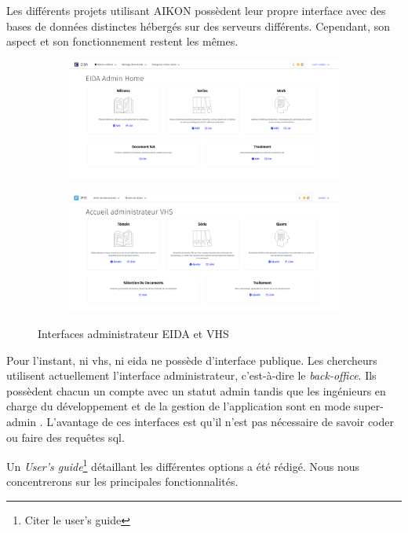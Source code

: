 Les différents projets utilisant AIKON possèdent leur propre interface avec des bases de données distinctes hébergés sur des serveurs différents. Cependant, son aspect et son fonctionnement restent les mêmes.

\begin{figure}[h]
	\centering
	\begin{subfigure}{0.48\linewidth}
		\centering
		\includegraphics[width=\linewidth]{images/accueil_eida.png}
	\end{subfigure}
	\hfill
	\begin{subfigure}{0.48\linewidth}
		\centering
		\includegraphics[width=\linewidth]{images/accueil_vhs.png}
	\end{subfigure}
	\caption{Interfaces administrateur EIDA et VHS}
	\label{fig:interface_accueil}
\end{figure}

Pour l'instant, ni \gls{vhs}, ni \gls{eida} ne possède d'interface publique. Les chercheurs utilisent actuellement l'interface administrateur, c'est-à-dire le \textit{back-office}. Ils possèdent chacun un compte avec un statut \og admin \fg tandis que les ingénieurs en charge du développement et de la gestion de l'application sont en mode \og super-admin \fg. L'avantage de ces interfaces est qu'il n'est pas nécessaire de savoir coder ou faire des requêtes \gls{sql}.

Un \textit{User's guide}\footnote{Citer le user's guide} détaillant les différentes options a été rédigé. Nous nous concentrerons sur les principales fonctionnalités.




